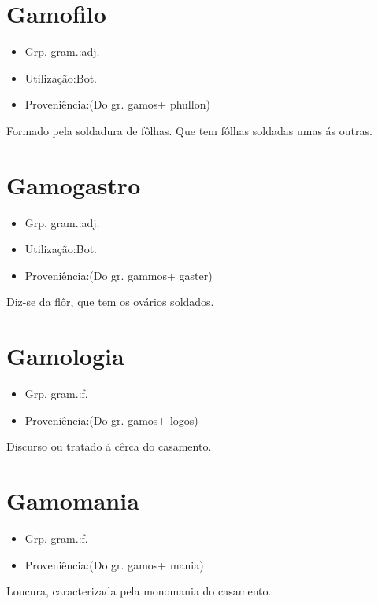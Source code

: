 \section{Gamofilo}
\begin{itemize}
\item {Grp. gram.:adj.}
\end{itemize}
\begin{itemize}
\item {Utilização:Bot.}
\end{itemize}
\begin{itemize}
\item {Proveniência:(Do gr. \textunderscore gamos\textunderscore  + \textunderscore phullon\textunderscore )}
\end{itemize}
Formado pela soldadura de fôlhas.
Que tem fôlhas soldadas umas ás outras.
\section{Gamogastro}
\begin{itemize}
\item {Grp. gram.:adj.}
\end{itemize}
\begin{itemize}
\item {Utilização:Bot.}
\end{itemize}
\begin{itemize}
\item {Proveniência:(Do gr. \textunderscore gammos\textunderscore  + \textunderscore gaster\textunderscore )}
\end{itemize}
Diz-se da flôr, que tem os ovários soldados.
\section{Gamologia}
\begin{itemize}
\item {Grp. gram.:f.}
\end{itemize}
\begin{itemize}
\item {Proveniência:(Do gr. \textunderscore gamos\textunderscore  + \textunderscore logos\textunderscore )}
\end{itemize}
Discurso ou tratado á cêrca do casamento.
\section{Gamomania}
\begin{itemize}
\item {Grp. gram.:f.}
\end{itemize}
\begin{itemize}
\item {Proveniência:(Do gr. \textunderscore gamos\textunderscore  + \textunderscore mania\textunderscore )}
\end{itemize}
Loucura, caracterizada pela monomania do casamento.
